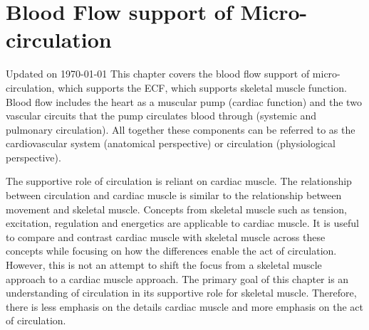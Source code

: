 \chapter{Blood Flow support of Micro-circulation}\label{chp:blood_flow}
Updated on \today
\minitoc
This chapter covers the blood flow support of micro-circulation, which supports the ECF, which supports skeletal muscle function. Blood flow includes the heart as a muscular pump (cardiac function) and the two vascular circuits that the pump circulates blood through (systemic and pulmonary circulation). All together these components can be referred to as the cardiovascular system (anatomical perspective) or circulation (physiological perspective). 

The supportive role of circulation is reliant on cardiac muscle. The relationship between circulation and cardiac muscle is similar to the relationship between movement and skeletal muscle. Concepts from skeletal muscle such as tension, excitation, regulation and energetics are applicable to cardiac muscle. It is useful to compare and contrast cardiac muscle with skeletal muscle across these concepts while focusing on how the differences enable the act of circulation. However, this is not an attempt to shift the focus from a skeletal muscle approach to a cardiac muscle approach. The primary goal of this chapter is an understanding of circulation in its supportive role for skeletal muscle. Therefore, there is less emphasis on the details cardiac muscle and more emphasis on the act of circulation.\footnotemark{} 



\vspace{5mm}

